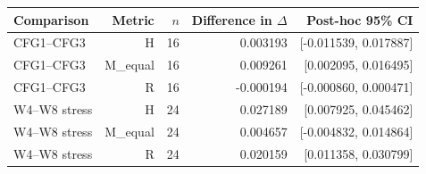 {\small\setlength{\tabcolsep}{3pt}
\begin{tabular}{lrrrr}
\hline
Comparison & Metric & $n$ & Difference in $\Delta$ & Post-hoc 95\% CI \\
\hline
CFG1--CFG3 & H & 16 & 0.003193 & [-0.011539, 0.017887] \\
CFG1--CFG3 & M\_equal & 16 & 0.009261 & [0.002095, 0.016495] \\
CFG1--CFG3 & R & 16 & -0.000194 & [-0.000860, 0.000471] \\
W4--W8 stress & H & 24 & 0.027189 & [0.007925, 0.045462] \\
W4--W8 stress & M\_equal & 24 & 0.004657 & [-0.004832, 0.014864] \\
W4--W8 stress & R & 24 & 0.020159 & [0.011358, 0.030799] \\
\hline
\end{tabular}
}

